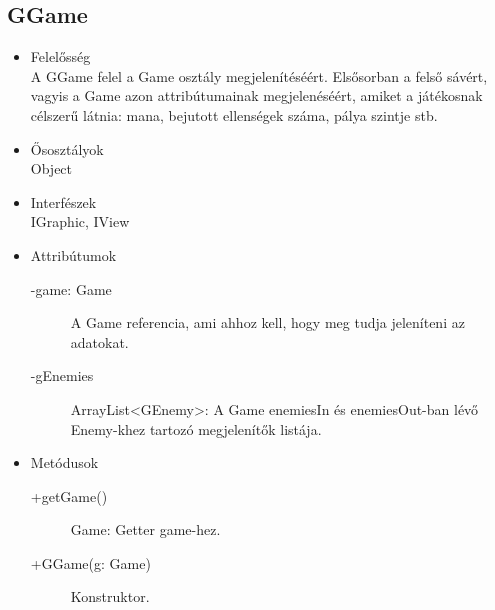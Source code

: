 \subsection{GGame}
\begin{itemize}
\item Felelősség\\
A GGame felel a Game osztály megjelenítéséért. Elsősorban a felső sávért, vagyis a Game azon attribútumainak megjelenéséért, amiket a játékosnak célszerű látnia: mana, bejutott ellenségek száma, pálya szintje stb. 
\item Ősosztályok\\
Object
\item Interfészek\\
IGraphic, IView
\item Attribútumok\\
	\begin{description}
		\item[-game: Game] A Game referencia, ami ahhoz kell, hogy meg tudja jeleníteni az adatokat.
		\item[-gEnemies] ArrayList<GEnemy>: A Game enemiesIn és enemiesOut-ban lévő Enemy-khez tartozó megjelenítők listája. 
\end{description}
\item Metódusok\\
	\begin{description}
		\item[+getGame()] Game: Getter game-hez.
		\item[+GGame(g: Game)] Konstruktor.
	\end{description}
\end{itemize}

